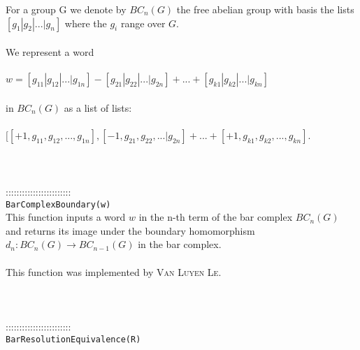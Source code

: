 \documentclass[a4paper,11pt]{report}
\begin{document}
{ For a group G we denote by $BC_n(G)$ the free abelian group with basis the lists $[g_1 | g_2 | ... | g_n]$ where the $g_i$ range over $G$. \\
 \\
 We represent a word \\
 \\
 $w = [g_{11} | g_{12} | ... | g_{1n}] - [g_{21} | g_{22} | ... | g_{2n}] + ...
+ [g_{k1} | g_{k2} | ... | g_{kn}] $ \\
 \\
 in $BC_n(G)$ as a list of lists: \\
 \\
 $ [ [+1,g_{11} , g_{12} , ... , g_{1n}] , [-1, g_{21} , g_{22} , ... | g_{2n}] +
... + [+1, g_{k1} , g_{k2} , ... , g_{kn}] $. \\
 \\
 \\
 \\
 ::::::::::::::::::::::::\\
 \texttt{BarComplexBoundary(w)}\\
 

 This function inputs a word $w$ in the n-th term of the bar complex $BC_n(G)$ and returns its image under the boundary homomorphism $d_n\colon BC_n(G) \rightarrow BC_{n-1}(G)$ in the bar complex. \\
 \\
 This function was implemented by \textsc{Van Luyen Le}. \\
 \\
 \\
 \\
 ::::::::::::::::::::::::\\
 \texttt{BarResolutionEquivalence(R)}\\
 

}
\end{document}
